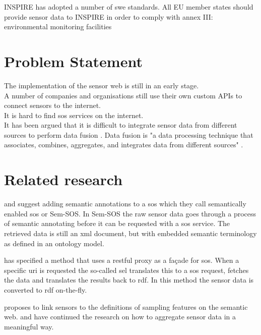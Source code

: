 INSPIRE has adopted a number of \ac{swe} standards. All EU member states should provide sensor data to INSPIRE in order to comply with annex III: environmental monitoring facilities \\

\section{Problem Statement}
The implementation of the sensor web is still in an early stage. \\

A number of companies and organisations still use their own custom APIs to connect sensors to the internet. \\

It is hard to find \ac{sos} services on the internet. \\

It has been argued that it is difficult to integrate sensor data from different sources to perform data fusion \citep{SSW:Corcho, SSW:Ji, SSW:Wang}. Data fusion is "a data processing technique that associates, combines, aggregates, and integrates data from different sources" \cite[p. 2]{SSW:Perera}. \\


\section{Related research}
\cite{SSW:Henson} and \cite{SSW:Pschorr} suggest adding semantic annotations to a \ac{sos} which they call semantically enabled \ac{sos} or Sem-SOS. In Sem-SOS the raw sensor data goes through a process of semantic annotating before it can be requested with a \ac{sos} service. The retrieved data is still an \ac{xml} document, but with embedded semantic terminology as defined in an ontology model. 

\cite{SSW:Janowicz} has specified a method that uses a \ac{rest}ful proxy as a fa\c{c}ade for \ac{sos}. When a specific \ac{uri} is requested the so-called \ac{sel} translates this to a \ac{sos} request, fetches the data and translates the results back to \ac{rdf}. In this method the sensor data is converted to \ac{rdf} on-the-fly.  

\cite{SSW:Stasch} proposes to link sensors to the definitions of sampling features on the semantic web. \cite{SSW:Stasch5} and \cite{SSW:Stasch4} have continued the research on how to aggregate sensor data in a meaningful way. 

